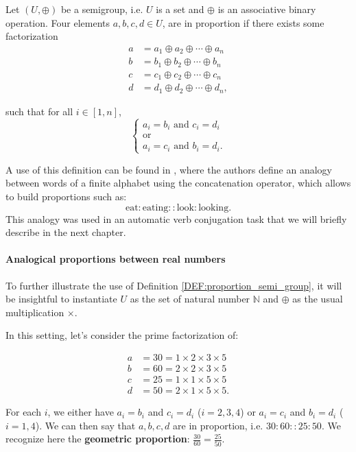 \begin{definition}
\label{DEF:proportion_semi_group}
Let $(U, \oplus)$ be a semigroup, i.e. $U$ is a set and $\oplus$ is an
  associative binary operation. Four elements $a, b, c, d \in U$, are in proportion if
  there exists some factorization
  \begin{align*}
    a &= a_1 \oplus a_2 \oplus \cdots \oplus a_n\\
    b &= b_1 \oplus b_2 \oplus \cdots \oplus b_n\\
    c &= c_1 \oplus c_2 \oplus \cdots \oplus c_n\\
    d &= d_1 \oplus d_2 \oplus \cdots \oplus d_n,
  \end{align*}

  such that for all $i \in [1, n]$,
  $$
  \begin{cases}
    a_i = b_i \text{ and } c_i = d_i\\
    \text{or}\\
    a_i = c_i \text{ and } b_i = d_i.
  \end{cases}
  $$
\end{definition}

\begin{testexample}
  A use of this definition can be found in \cite{StrYvoREPORT05}, where
  the authors define an analogy between words of a finite alphabet using the
  concatenation operator, which allows to build proportions such as:
  $$\text{eat} : \text{eating} :: \text{look} : \text{looking}.$$ This analogy
  was used in an automatic verb conjugation task that we will briefly describe
  in the next chapter.
\end{testexample}

\paragraph{Analogical proportions between real numbers\\}

To further illustrate the use of Definition \ref{DEF:proportion_semi_group}, it
will be insightful to instantiate $U$ as the set of natural number $\mathbb{N}$
and $\oplus$ as the usual multiplication $\times$.
\begin{testexample}
  In this setting, let's consider the prime factorization of:

  \begin{align*}
    a &= 30 = 1 \times 2 \times 3 \times 5\\
    b &= 60 = 2 \times 2 \times 3 \times 5\\
    c &= 25 = 1 \times 1 \times 5 \times 5\\
    d &= 50 = 2 \times 1 \times 5 \times 5.
  \end{align*}

For each $i$, we either have $a_i = b_i$ and $c_i = d_i$ ($i = 2, 3, 4$) or
$a_i = c_i$ and $b_i = d_i$ ($i = 1, 4$). We can then say that $a, b, c, d$ are
in proportion, i.e. $30: 60 :: 25: 50$. We recognize here the \textbf{geometric
  proportion}: $\frac{30}{60} = \frac{25}{50}$.
\end{testexample}

